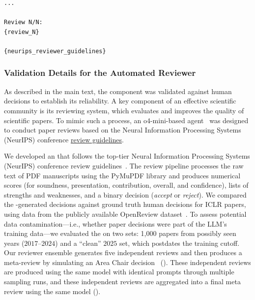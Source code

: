\begin{appendices}
\begin{tcolorbox}[breakable, colback=orange!5!white, colframe=orange!80!black, title=Paper Review Ensembling Prompt]
\begin{Verbatim}[breaklines, breaksymbol={}, breaksymbolleft={}, fontsize=\small]
...

Review N/N:
{review_N}

{neurips_reviewer_guidelines}
\end{Verbatim}
\end{tcolorbox}


\subsubsection{Validation Details for the Automated Reviewer}
\label{app:v1_reviewer_details}
As described in the main text, the \ourreviewer component was validated against human decisions to establish its reliability.
A key component of an effective scientific community is its reviewing system, which evaluates and improves the quality of scientific papers.
To mimic such a process, an o4-mini-based agent~\citep{openai2025o3o4mini} was designed to conduct paper reviews based on the Neural Information Processing Systems (NeurIPS) conference \href{https://neurips.cc/Conferences/2022/ReviewerGuidelines}{review guidelines}.

We developed an \ourreviewer that follows the top-tier Neural Information Processing Systems (NeurIPS) conference review guidelines~\citep{neurips2022reviewerguidelines}.
The review pipeline processes the raw text of PDF manuscripts using the PyMuPDF library and produces numerical scores (for soundness, presentation, contribution, overall, and confidence), lists of strengths and weaknesses, and a binary decision (\textit{accept} or \textit{reject}).
We compared the \ourreviewer-generated decisions against ground truth human decisions for ICLR papers, using data from the publicly available OpenReview dataset~\citep{gonzalez2024learning}.
To assess potential data contamination—i.e., whether paper decisions were part of the LLM's training data—we evaluated the \ourreviewer on two sets: 1,000 papers from possibly seen years ($2017$–$2024$) and a ``clean'' $2025$ set, which postdates the training cutoff.
Our reviewer ensemble generates five independent reviews and then produces a meta-review by simulating an Area Chair decision~\citep{wang2022self} (). These independent reviews are produced using the same model with identical prompts through multiple sampling runs, and these independent reviews are aggregated into a final meta review using the same model ().


\end{appendices}
